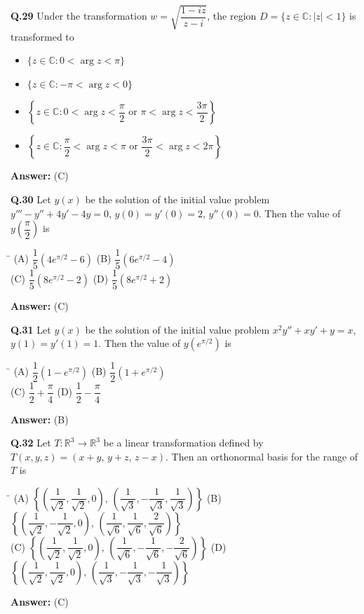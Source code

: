 \documentclass[11pt,a4paper]{article}
\newcommand{\optsfourA}[4]{%
  \begin{tabbing}
    \hspace{0.48\linewidth}\=\kill
    (A) #1 \> (B) #2 \\[2pt]
    (C) #3 \> (D) #4
  \end{tabbing}%
}
\newcommand{\optslistA}[4]{%
  \begin{itemize}
    \setlength{\itemsep}{2pt}\setlength{\parskip}{0pt}
    \item[(A)] #1
    \item[(B)] #2
    \item[(C)] #3
    \item[(D)] #4
  \end{itemize}%
}
\newcommand{\ans}[1]{\textbf{Answer:} #1\par\medskip}
\begin{document}
\textbf{Q.29} Under the transformation $w = \sqrt{\dfrac{1 - iz}{z - i}}$, the region $D = \{z \in \mathbb{C} : |z| < 1\}$ is transformed to
\optslistA{$\{z \in \mathbb{C} : 0 < \arg z < \pi\}$}{$\{z \in \mathbb{C} : -\pi < \arg z < 0\}$}{$\left\{z \in \mathbb{C} : 0 < \arg z < \dfrac{\pi}{2} \text{ or } \pi < \arg z < \dfrac{3\pi}{2}\right\}$}{$\left\{z \in \mathbb{C} : \dfrac{\pi}{2} < \arg z < \pi \text{ or } \dfrac{3\pi}{2} < \arg z < 2\pi\right\}$}
\ans{(C)}

\textbf{Q.30} Let $y(x)$ be the solution of the initial value problem $y''' - y'' + 4y' - 4y = 0$, $y(0) = y'(0) = 2$, $y''(0) = 0$. Then the value of $y\!\left(\dfrac{\pi}{2}\right)$ is
\optsfourA{$\dfrac{1}{5}\!\left(4e^{\pi/2} - 6\right)$}{$\dfrac{1}{5}\!\left(6e^{\pi/2} - 4\right)$}{$\dfrac{1}{5}\!\left(8e^{\pi/2} - 2\right)$}{$\dfrac{1}{5}\!\left(8e^{\pi/2} + 2\right)$}
\ans{(C)}

\textbf{Q.31} Let $y(x)$ be the solution of the initial value problem $x^2 y'' + xy' + y = x$, $y(1) = y'(1) = 1$. Then the value of $y(e^{\pi/2})$ is
\optsfourA{$\dfrac{1}{2}\!\left(1 - e^{\pi/2}\right)$}{$\dfrac{1}{2}\!\left(1 + e^{\pi/2}\right)$}{$\dfrac{1}{2} + \dfrac{\pi}{4}$}{$\dfrac{1}{2} - \dfrac{\pi}{4}$}
\ans{(B)}

\textbf{Q.32} Let $T : \mathbb{R}^3 \to \mathbb{R}^3$ be a linear transformation defined by $T(x, y, z) = (x + y,\, y + z,\, z - x)$. Then an orthonormal basis for the range of $T$ is
\optsfourA{$\left\{\left(\dfrac{1}{\sqrt{2}}, \dfrac{1}{\sqrt{2}}, 0\right),\, \left(\dfrac{1}{\sqrt{3}}, -\dfrac{1}{\sqrt{3}}, \dfrac{1}{\sqrt{3}}\right)\right\}$}{$\left\{\left(\dfrac{1}{\sqrt{2}}, -\dfrac{1}{\sqrt{2}}, 0\right),\, \left(\dfrac{1}{\sqrt{6}}, \dfrac{1}{\sqrt{6}}, \dfrac{2}{\sqrt{6}}\right)\right\}$}{$\left\{\left(\dfrac{1}{\sqrt{2}}, \dfrac{1}{\sqrt{2}}, 0\right),\, \left(\dfrac{1}{\sqrt{6}}, -\dfrac{1}{\sqrt{6}}, -\dfrac{2}{\sqrt{6}}\right)\right\}$}{$\left\{\left(\dfrac{1}{\sqrt{2}}, \dfrac{1}{\sqrt{2}}, 0\right),\, \left(\dfrac{1}{\sqrt{3}}, -\dfrac{1}{\sqrt{3}}, -\dfrac{1}{\sqrt{3}}\right)\right\}$}
\ans{(C)}
\end{document}
